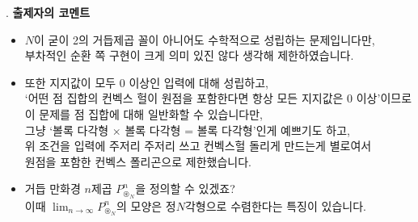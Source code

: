 \begin{frame}{\textbf{\pletter}. \ptitle}
    \textbf{출제자의 코멘트}
    \begin{itemize}
        \item $N$이 굳이 2의 거듭제곱 꼴이 아니어도 수학적으로 성립하는 문제입니다만,\\
        부차적인 순환 쪽 구현이 크게 의미 있진 않다 생각해 제한하였습니다.
        \item 또한 지지값이 모두 0 이상인 입력에 대해 성립하고, \\
        `어떤 점 집합의 컨벡스 헐이 원점을 포함한다면 항상 모든 지지값은 0 이상'이므로\\
        이 문제를 점 집합에 대해 일반화할 수 있습니다만,\\
        그냥 `볼록 다각형 $\times$ 볼록 다각형 = 볼록 다각형'인게 예쁘기도 하고, \\
        위 조건을 입력에 주저리 주저리 쓰고 컨벡스헐 돌리게 만드는게 별로여서\\
        원점을 포함한 컨벡스 폴리곤으로 제한했습니다.
        \item 거듭 만화경 $n$제곱 $P_{\circledast_N}^n$을 정의할 수 있겠죠? \\
        이때 $\lim_{n\to\infty}P_{\circledast_N}^n$의 모양은 정$N$각형으로 수렴한다는 특징이 있습니다. 
    \end{itemize}
\end{frame}